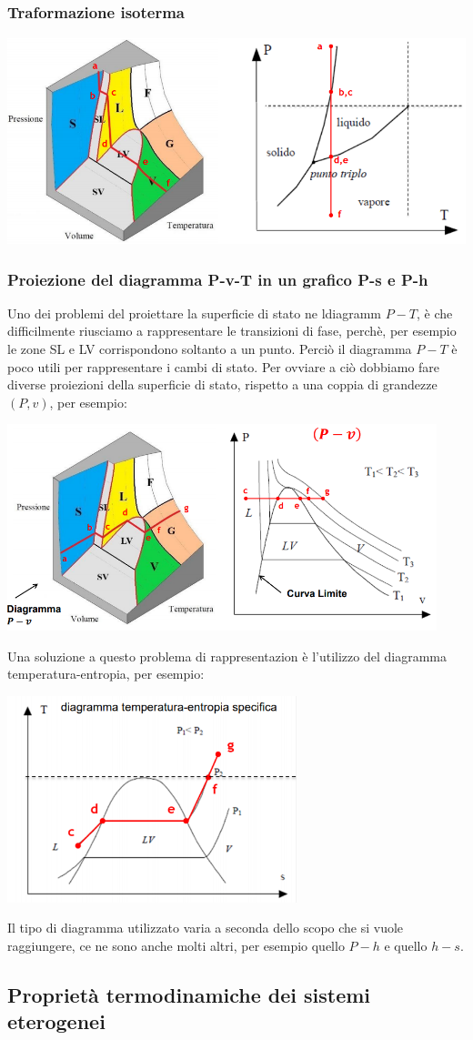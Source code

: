 \subsubsection{Traformazione isoterma}
\begin{center}
    \includegraphics[height=6cm]{../L04/img7.PNG}
\end{center}
\subsubsection{Proiezione del diagramma P-v-T in un grafico P-s e P-h}
Uno dei problemi del proiettare la superficie di stato ne ldiagramm $P-T$, è che difficilmente riusciamo a rappresentare le transizioni di fase, perchè, per esempio le zone SL e LV corrispondono soltanto a un punto. Perciò il diagramma $P-T$ è poco utili per rappresentare i cambi di stato. Per ovviare a ciò dobbiamo fare diverse proiezioni della superficie di stato, rispetto a una coppia di grandezze $(P,v)$, per esempio:
\begin{center}
    \includegraphics[height=6cm]{../L04/img8.PNG}
\end{center}
Una soluzione a questo problema di rappresentazion è l'utilizzo del diagramma temperatura-entropia, per esempio:
\begin{center}
    \includegraphics[height=6cm]{../L04/img9.PNG}
\end{center}
Il tipo di diagramma utilizzato varia a seconda dello scopo che si vuole raggiungere, ce ne sono anche molti altri, per esempio quello $P-h$ e quello $h-s$.
\subsection{Proprietà termodinamiche dei sistemi eterogenei}